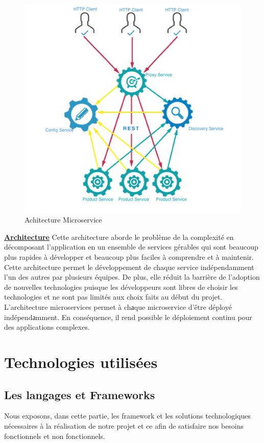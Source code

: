 \begin{figure}[H]
    \centering
    \includegraphics[width=0.7\columnwidth]{images/les12.PNG}
    \caption{Achitecture Microservice}
    \label{fig:Global}  
    \end{figure}
    \itemindent\textbf {\underline{Architecture}}
Cette architecture aborde le problème de la complexité
en décomposant l'application en un ensemble de services gérables qui sont beaucoup plus rapides
à développer et beaucoup plus faciles à comprendre et à maintenir. Cette architecture permet le développement de chaque service indépendamment l’un des autres par plusieurs équipes. De plus, elle réduit la barrière de l’adoption de nouvelles technologies puisque les développeurs sont libres de
choisir les technologies et ne sont pas limités aux choix faits au début du projet.
L’architecture microservices permet à chаque microservice d’être déployé indépendаmment. En conséquence, il rend possible le déploiement continu pour des applications complexes.

 \section{Technologies utilisées}
 \subsection{Les langages et Frameworks}
 Nous exposons, dans cette partie, les framework et les solutions technologiques nécessaires à la réalisation de notre projet et ce afin de satisfaire nos besoins fonctionnels et non fonctionnels.
 

